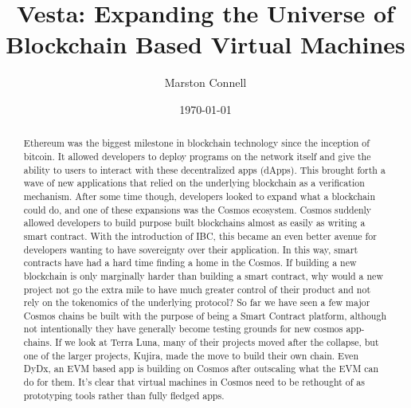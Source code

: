 \documentclass[a4paper]{article}
\begin{document}
\title{Vesta: Expanding the Universe of Blockchain Based Virtual Machines}

\author{Marston Connell}

\date{\today}


\maketitle
\newpage


\begin{abstract}
    Ethereum was the biggest milestone in blockchain technology since the inception of bitcoin. It allowed developers to deploy programs on the network itself and give the ability to users to interact with these decentralized apps (dApps). This brought forth a wave of new applications that relied on the underlying blockchain as a verification mechanism. After some time though, developers looked to expand what a blockchain could do, and one of these expansions was the Cosmos ecosystem. Cosmos suddenly allowed developers to build purpose built blockchains almost as easily as writing a smart contract. With the introduction of IBC, this became an even better avenue for developers wanting to have sovereignty over their application. In this way, smart contracts have had a hard time finding a home in the Cosmos. If building a new blockchain is only marginally harder than building a smart contract, why would a new project not go the extra mile to have much greater control of their product and not rely on the tokenomics of the underlying protocol? So far we have seen a few major Cosmos chains be built with the purpose of being a Smart Contract platform, although not intentionally they have generally become testing grounds for new cosmos app-chains. If we look at Terra Luna, many of their projects moved after the collapse, but one of the larger projects, Kujira, made the move to build their own chain. Even DyDx, an EVM based app is building on Cosmos after outscaling what the EVM can do for them. It’s clear that virtual machines in Cosmos need to be rethought of as prototyping tools rather than fully fledged apps.
\end{abstract}

\newpage
\tableofcontents
\newpage
\end{document}
